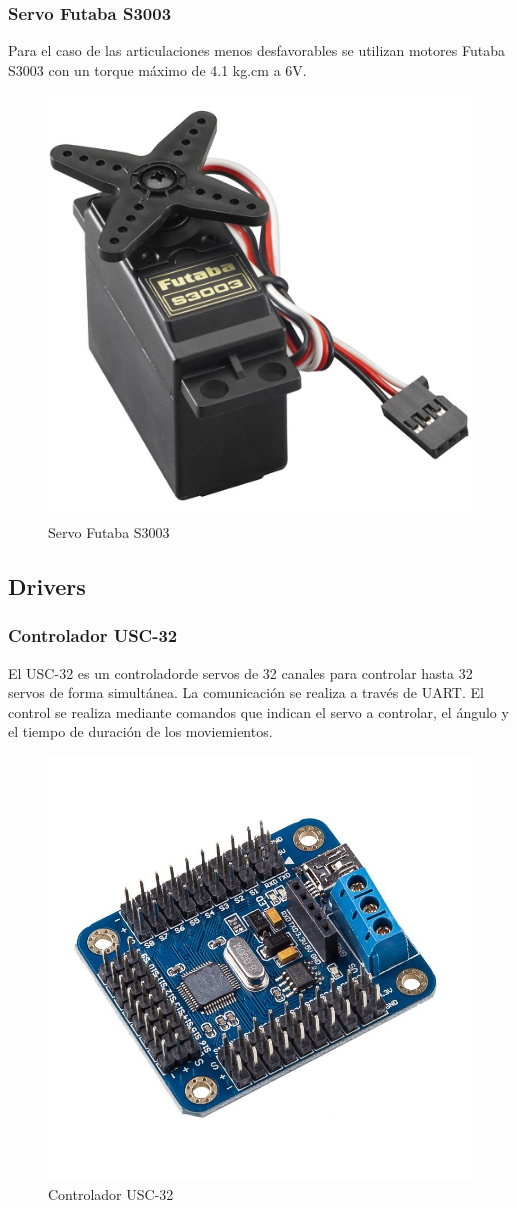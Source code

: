 \documentclass{article}
\begin{document}
\subsubsection{Servo Futaba S3003}

Para el caso de las articulaciones menos desfavorables se utilizan motores Futaba S3003 con un torque máximo de 4.1 kg.cm a 6V.

\begin{figure}[!ht]
  \centering
  \includegraphics[width=0.5\linewidth]{FUT.jpg}
  \caption{Servo Futaba S3003}
\end{figure}



\subsection{Drivers}

\subsubsection{Controlador USC-32}

El USC-32 es un controladorde servos de 32 canales para controlar hasta 32 servos de forma simultánea. La comunicación se realiza a través de UART. El control se realiza mediante comandos que indican el servo a controlar, el ángulo y el tiempo de duración de los moviemientos.

\begin{figure}[!h]
  \centering
  \includegraphics[width=0.5\linewidth]{Driver.jpg}
  \caption{Controlador USC-32}
\end{figure}
\end{document}
